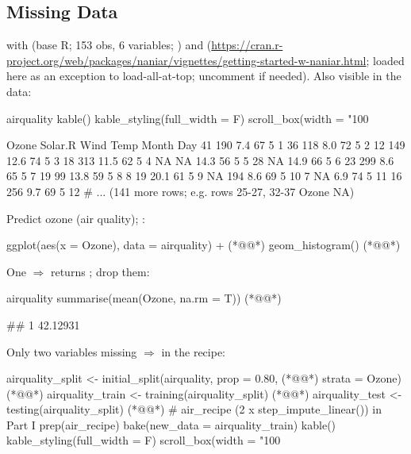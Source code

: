 \subsection{Missing Data}
%
 with  (base R; 153 obs, 6 variables; ) and  (\url{https://cran.r-project.org/web/packages/naniar/vignettes/getting-started-w-naniar.html}; loaded here as an exception to load-all-at-top; uncomment  if needed).
Also visible in the data:
\begin{rcode}
airquality %
  kable() %
  kable_styling(full_width = F) %
  scroll_box(width = "100%
\end{rcode}
\begin{routput}
Ozone Solar.R Wind Temp Month Day
   41     190  7.4   67     5   1
   36     118  8.0   72     5   2
   12     149 12.6   74     5   3
   18     313 11.5   62     5   4
   NA      NA 14.3   56     5   5
   28      NA 14.9   66     5   6
   23     299  8.6   65     5   7
   19      99 13.8   59     5   8
    8      19 20.1   61     5   9
   NA     194  8.6   69     5  10
    7      NA  6.9   74     5  11
   16     256  9.7   69     5  12
# ... (141 more rows; e.g. rows 25-27, 32-37 Ozone NA)
\end{routput}
Predict ozone (air quality); :
\begin{rcode}
ggplot(aes(x = Ozone), data = airquality) +   (*@@*)
  geom_histogram()                            (*@@*)
\end{rcode}
One  $\Rightarrow$  returns ; drop them:
\begin{rcode}
airquality %
  summarise(mean(Ozone, na.rm = T))   (*@@*)
\end{rcode}
\begin{routput}
## 1               42.12931
\end{routput}
Only two variables missing $\Rightarrow$  in the recipe:
\begin{rcode}
airquality_split <- initial_split(airquality, prop = 0.80,  (*@@*)
                                strata = Ozone)             (*@@*)
airquality_train <- training(airquality_split)              (*@@*)
airquality_test <- testing(airquality_split)                (*@@*)
# air_recipe (2 x step_impute_linear()) in Part I
prep(air_recipe) %
  bake(new_data = airquality_train) %
  kable() %
  kable_styling(full_width = F) %
  scroll_box(width = "100%
\end{rcode}
